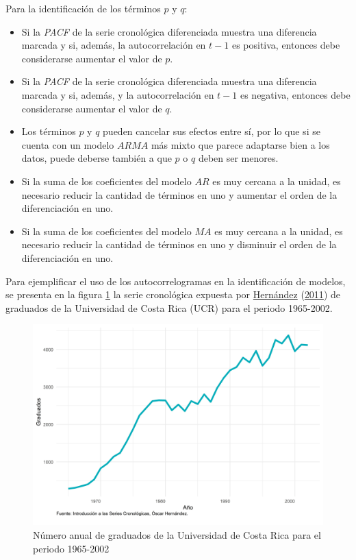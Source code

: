 \documentclass[
]{article}
\providecommand{\tightlist}{%
  \setlength{\itemsep}{0pt}\setlength{\parskip}{0pt}}
\begin{document}
Para la identificación de los términos \(p\) y \(q\):

\begin{itemize}
\tightlist
\item
  Si la \emph{PACF} de la serie cronológica diferenciada muestra una
  diferencia marcada y si, además, la autocorrelación en \(t-1\) es
  positiva, entonces debe considerarse aumentar el valor de \(p\).
\item
  Si la \emph{PACF} de la serie cronológica diferenciada muestra una
  diferencia marcada y si, además, y la autocorrelación en \(t-1\) es
  negativa, entonces debe considerarse aumentar el valor de \(q\).
\item
  Los términos \(p\) y \(q\) pueden cancelar sus efectos entre sí, por
  lo que si se cuenta con un modelo \(ARMA\) más mixto que parece
  adaptarse bien a los datos, puede deberse también a que \(p\) o \(q\)
  deben ser menores.
\item
  Si la suma de los coeficientes del modelo \(AR\) es muy cercana a la
  unidad, es necesario reducir la cantidad de términos en uno y aumentar
  el orden de la diferenciación en uno.
\item
  Si la suma de los coeficientes del modelo \(MA\) es muy cercana a la
  unidad, es necesario reducir la cantidad de términos en uno y
  disminuir el orden de la diferenciación en uno.
\end{itemize}

Para ejemplificar el uso de los autocorrelogramas en la identificación
de modelos, se presenta en la figura \ref{fig:ejemplo_ucr} la serie
cronológica expuesta por \protect\hyperlink{ref-oscarh-1}{Hernández}
(\protect\hyperlink{ref-oscarh-1}{2011}) de graduados de la Universidad
de Costa Rica (UCR) para el periodo 1965-2002.

\begin{figure}[H]
\includegraphics[width=1\linewidth,height=1\textheight]{Tesis_files/figure-latex/ejemplo_ucr-1} \caption{Número anual de graduados de la Universidad de Costa Rica para el periodo 1965-2002}\label{fig:ejemplo_ucr}
\end{figure}
\end{document}
